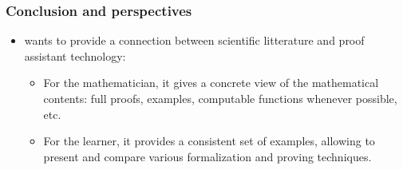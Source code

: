 \documentclass[10pt, fleqn]{beamer}
\begin{document}






\begin{frame}
  \frametitle{Conclusion and perspectives}
  \begin{block}{}
    \begin{itemize}
    \item \Hydras wants to provide  a connection between scientific litterature and proof assistant technology:
      \begin{itemize}
      \item For the mathematician, it gives a concrete view of the mathematical contents: full proofs, examples, computable functions whenever possible, etc.
        \item  For the \coq learner, it provides a consistent set of examples,
allowing to present and compare various formalization and proving techniques.
      \end{itemize}
    \end{itemize}
  \end{block}
  \end{frame}
\end{document}
